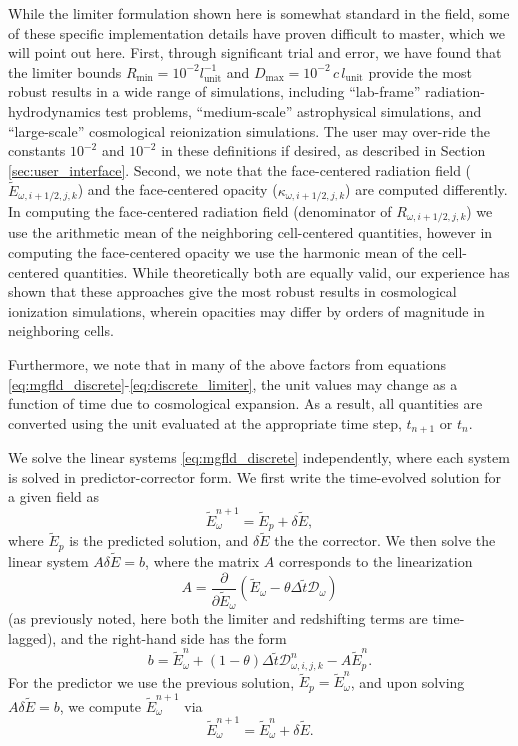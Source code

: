 \documentclass[10pt]{article}
\renewcommand{\(}{\left(}
\renewcommand{\)}{\right)}
\newcommand{\mD}{{\mathcal D}}
\newcommand{\Lunit}{l_{\text{unit}}}
\newcommand{\tT}{\tilde{t}}
\newcommand{\tE}{\tilde{E}}
\begin{document}
While the limiter formulation shown here is somewhat standard in the
field, some of these specific implementation details have proven
difficult to master, which we will point out here.  First, through
significant trial and error, we have found that the limiter
bounds $R_\text{min}=10^{-2} \Lunit^{-1}$ and 
$D_\text{max}=10^{-2}\, c\, \Lunit$ provide the most robust results
in a wide range of simulations, including ``lab-frame''
radiation-hydrodynamics test problems, ``medium-scale'' astrophysical
simulations, and ``large-scale'' cosmological reionization
simulations.  The user may over-ride the constants $10^{-2}$ and
$10^{-2}$ in these definitions if desired, as described in Section
\ref{sec:user_interface}.  Second, we note that the face-centered
radiation field ($\tE_{\omega,i+1/2,j,k}$) and the face-centered
opacity ($\kappa_{\omega,i+1/2,j,k}$) are computed differently.  In
computing the face-centered radiation field (denominator of
$R_{\omega,i+1/2,j,k}$) we use the arithmetic mean of the neighboring 
cell-centered quantities, however in computing the face-centered
opacity we use the harmonic mean of the cell-centered quantities.
While theoretically both are equally valid, our experience has shown
that these approaches give the most robust results in cosmological
ionization simulations, wherein opacities may differ by orders of
magnitude in neighboring cells.

Furthermore, we note that in many of the above factors from equations
\eqref{eq:mgfld_discrete}-\eqref{eq:discrete_limiter}, the unit
values may change as a function of time due to cosmological expansion.
As a result, all quantities are converted using the unit evaluated at
the appropriate time step, $t_{n+1}$ or $t_n$.

We solve the linear systems \eqref{eq:mgfld_discrete} independently,
where each system is solved in predictor-corrector form.  We first
write the time-evolved solution for a given field as 
\[
  \tE_{\omega}^{n+1} = \tE_{p} + \delta\tE,
\]
where $\tE_p$ is the predicted solution, and $\delta\tE$ the the
corrector.  We then solve the linear system $A \delta\tE = b$, where
the matrix $A$ corresponds to the linearization
\[
   A = \frac{\partial}{\partial\tE_{\omega}} \left(\tE_{\omega} - \theta\Delta \tT \mD_{\omega}\right)
\]
(as previously noted, here both the limiter and redshifting terms are
time-lagged), and the right-hand side has the form
\[
  b = \tE_{\omega}^n + (1-\theta)\Delta \tT \mD_{\omega,i,j,k}^{n} - A\tE_{p}^n.
\]
For the predictor we use the previous solution, $\tE_p =
\tE_{\omega}^n$, and upon solving $A \delta\tE = b$, we compute
$\tE_{\omega}^{n+1}$ via
\[
  \tE_{\omega}^{n+1} = \tE_{\omega}^n + \delta\tE.
\]
\end{document}
